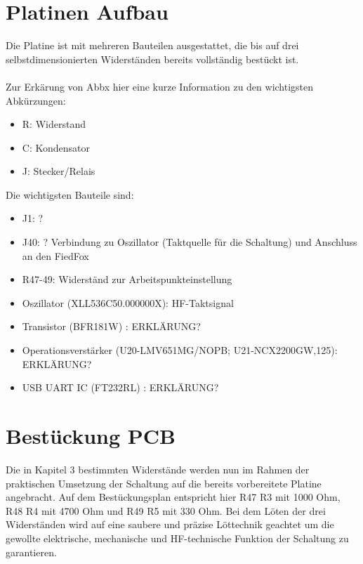 
\section{Platinen Aufbau}
Die Platine ist mit mehreren Bauteilen ausgestattet, die bis auf drei selbstdimensionierten Widerständen
bereits vollständig bestückt ist. \\
\\
Zur Erkärung von Abbx hier eine kurze Information zu den wichtigsten Abkürzungen:
\begin{itemize}
    \item R: Widerstand
    \item C: Kondensator
    \item J: Stecker/Relais

    
\end{itemize}
Die wichtigsten Bauteile sind:
\begin{itemize}
    \item J1: ?
    \item J40:  ? Verbindung zu Oszillator (Taktquelle für die Schaltung) und Anschluss an den FiedFox
    \item R47-49: Widerständ zur Arbeitspunkteinstellung
    \item Oszillator (XLL536C50.000000X): HF-Taktsignal
    \item Transistor (BFR181W) : ERKLÄRUNG?
    \item Operationsverstärker (U20-LMV651MG/NOPB; U21-NCX2200GW,125): ERKLÄRUNG?
    \item USB UART IC (FT232RL) : ERKLÄRUNG?
\end{itemize}



\section{Bestückung PCB}
Die in Kapitel 3 bestimmten Widerstände werden nun im Rahmen der praktischen Umsetzung der Schaltung auf die 
bereits vorbereitete Platine angebracht. Auf dem Bestückungsplan entspricht hier R47 R3 mit 1000 Ohm, R48 R4 mit 
4700 Ohm und R49 R5 mit 330 Ohm. Bei dem Löten der drei Widerständen wird auf eine saubere und präzise Löttechnik
geachtet um die gewollte elektrische, mechanische und HF-technische Funktion der Schaltung zu garantieren. 

